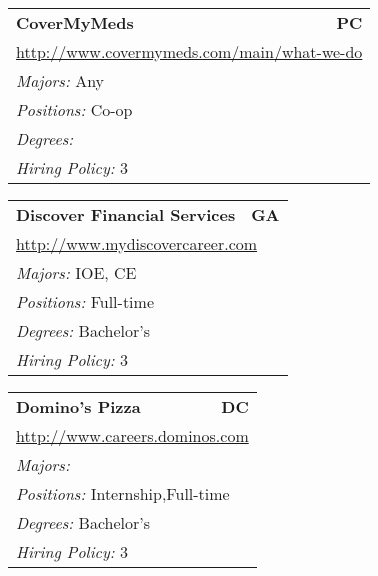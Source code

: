 \documentclass[twoside]{article}
\begin{document}
\begin{center}
\begin{multicols}{3}
\begin{FlushLeft}
\begin{minipage}{.9\columnwidth}
\end{minipage}
 
\begin{minipage}{.9\columnwidth}\begin{tabularx}{.95\columnwidth}{Xr}
                 {\Large\bf CoverMyMeds} & {\Large\bf PC}\\
    \multicolumn{2}{p{.95\columnwidth}}{\url{http://www.covermymeds.com/main/what-we-do}}\\
    \multicolumn{2}{p{.95\columnwidth}}{\emph{Majors:} Any}\\
    \multicolumn{2}{p{.95\columnwidth}}{\emph{Positions:} Co-op}\\
    \multicolumn{2}{p{.95\columnwidth}}{\emph{Degrees:} }\\
    \multicolumn{2}{p{.95\columnwidth}}{\emph{Hiring Policy:} 3}\\
    \end{tabularx}
    
\end{minipage}
 
\begin{minipage}{.9\columnwidth}\begin{tabularx}{.95\columnwidth}{Xr}
                 {\Large\bf Discover Financial Services} & {\Large\bf GA}\\
    \multicolumn{2}{p{.95\columnwidth}}{\url{http://www.mydiscovercareer.com}}\\
    \multicolumn{2}{p{.95\columnwidth}}{\emph{Majors:} IOE, CE}\\
    \multicolumn{2}{p{.95\columnwidth}}{\emph{Positions:} Full-time}\\
    \multicolumn{2}{p{.95\columnwidth}}{\emph{Degrees:} Bachelor's}\\
    \multicolumn{2}{p{.95\columnwidth}}{\emph{Hiring Policy:} 3}\\
    \end{tabularx}
    
\end{minipage}
 
\begin{minipage}{.9\columnwidth}\begin{tabularx}{.95\columnwidth}{Xr}
                 {\Large\bf Domino's Pizza} & {\Large\bf DC}\\
    \multicolumn{2}{p{.95\columnwidth}}{\url{http://www.careers.dominos.com}}\\
    \multicolumn{2}{p{.95\columnwidth}}{\emph{Majors:} }\\
    \multicolumn{2}{p{.95\columnwidth}}{\emph{Positions:} Internship,Full-time}\\
    \multicolumn{2}{p{.95\columnwidth}}{\emph{Degrees:} Bachelor's}\\
    \multicolumn{2}{p{.95\columnwidth}}{\emph{Hiring Policy:} 3}\\
    \end{tabularx}
    

\end{minipage}
\end{FlushLeft}
\end{multicols}
\end{center}
\end{document}
